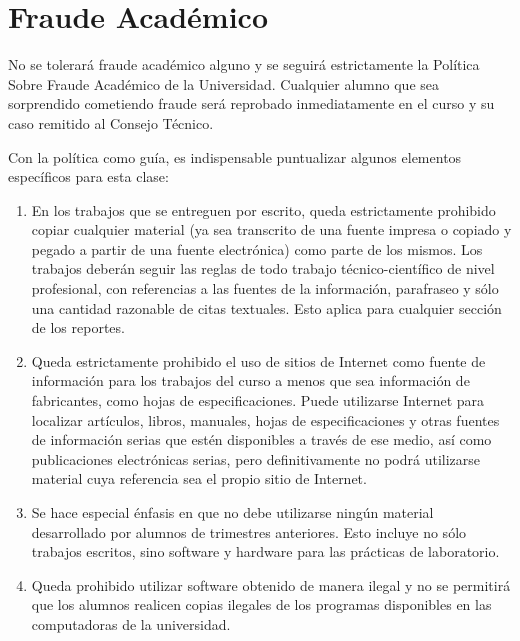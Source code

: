 \documentclass[letterpaper, 11pt]{article}
\begin{document}
\section{Fraude Académico}

No se tolerará fraude académico alguno y se seguirá estrictamente la Política Sobre Fraude Académico de la Universidad. Cualquier alumno que sea sorprendido cometiendo fraude será reprobado inmediatamente en el curso y su caso remitido al Consejo Técnico.

Con la política como guía, es indispensable puntualizar algunos elementos específicos para esta clase:

\begin{enumerate}
	\item  En los trabajos que se entreguen por escrito, queda estrictamente prohibido copiar cualquier material (ya sea transcrito de una fuente impresa o copiado y pegado a partir de una fuente electrónica) como parte de los mismos. Los trabajos deberán seguir las reglas de todo trabajo técnico-científico de nivel profesional, con referencias a las fuentes de la información, parafraseo y sólo una cantidad razonable de citas textuales. Esto aplica para cualquier sección de los reportes.

	\item Queda estrictamente prohibido el uso de sitios de Internet como fuente de información para los trabajos del curso a menos que sea información de fabricantes, como hojas de especificaciones. Puede utilizarse Internet para localizar artículos, libros, manuales, hojas de especificaciones y otras fuentes de información serias que estén disponibles a través de ese medio, así como publicaciones electrónicas serias, pero definitivamente no podrá utilizarse material cuya referencia sea el propio sitio de Internet.

	\item Se hace especial énfasis en que no debe utilizarse ningún material desarrollado por alumnos de trimestres anteriores. Esto incluye no sólo trabajos escritos, sino software y hardware para las prácticas de laboratorio.%

	\item Queda prohibido utilizar software obtenido de manera ilegal y no se permitirá que los alumnos realicen copias ilegales de los programas disponibles en las computadoras de la universidad.
\end{enumerate}
\end{document}
